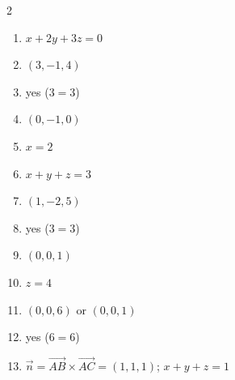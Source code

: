 \documentclass[11pt]{article}
\begin{document}
\begin{keybox}
\begin{multicols}{2}
\small
\begin{enumerate}[leftmargin=*,itemsep=3pt]
  \item $x+2y+3z=0$
  \item $(3,-1,4)$
  \item yes ($3=3$)
  \item $(0,-1,0)$
  \item $x=2$
  \item $x+y+z=3$
  \item $(1,-2,5)$
  \item yes ($3=3$)
  \item $(0,0,1)$
  \item $z=4$
  \item $(0,0,6)$ or $(0,0,1)$
  \item yes ($6=6$)
  \item $\vec n=\vec{AB}\times\vec{AC}=(1,1,1)$; $x+y+z=1$
\end{enumerate}
\end{multicols}
\end{keybox}
\end{document}
